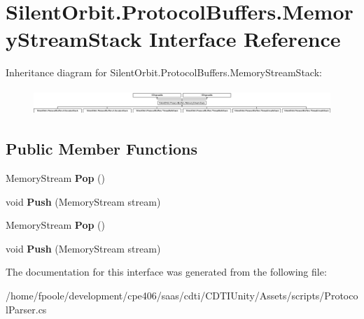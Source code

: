 \hypertarget{interface_silent_orbit_1_1_protocol_buffers_1_1_memory_stream_stack}{}\section{Silent\+Orbit.\+Protocol\+Buffers.\+Memory\+Stream\+Stack Interface Reference}
\label{interface_silent_orbit_1_1_protocol_buffers_1_1_memory_stream_stack}
Inheritance diagram for Silent\+Orbit.\+Protocol\+Buffers.\+Memory\+Stream\+Stack\+:\begin{figure}[H]
\begin{center}
\leavevmode
\includegraphics[height=0.962199cm]{interface_silent_orbit_1_1_protocol_buffers_1_1_memory_stream_stack}
\end{center}
\end{figure}
\subsection*{Public Member Functions}
\begin{DoxyCompactItemize}
\item 
\hypertarget{interface_silent_orbit_1_1_protocol_buffers_1_1_memory_stream_stack_a7408e30789e2d7ee77cd166e69b98a48}{}Memory\+Stream {\bfseries Pop} ()\label{interface_silent_orbit_1_1_protocol_buffers_1_1_memory_stream_stack_a7408e30789e2d7ee77cd166e69b98a48}

\item 
\hypertarget{interface_silent_orbit_1_1_protocol_buffers_1_1_memory_stream_stack_a1ae64da82a0acdfaaec81a0697d3c070}{}void {\bfseries Push} (Memory\+Stream stream)\label{interface_silent_orbit_1_1_protocol_buffers_1_1_memory_stream_stack_a1ae64da82a0acdfaaec81a0697d3c070}

\item 
\hypertarget{interface_silent_orbit_1_1_protocol_buffers_1_1_memory_stream_stack_a7408e30789e2d7ee77cd166e69b98a48}{}Memory\+Stream {\bfseries Pop} ()\label{interface_silent_orbit_1_1_protocol_buffers_1_1_memory_stream_stack_a7408e30789e2d7ee77cd166e69b98a48}

\item 
\hypertarget{interface_silent_orbit_1_1_protocol_buffers_1_1_memory_stream_stack_a1ae64da82a0acdfaaec81a0697d3c070}{}void {\bfseries Push} (Memory\+Stream stream)\label{interface_silent_orbit_1_1_protocol_buffers_1_1_memory_stream_stack_a1ae64da82a0acdfaaec81a0697d3c070}

\end{DoxyCompactItemize}


The documentation for this interface was generated from the following file\+:\begin{DoxyCompactItemize}
\item 
/home/fpoole/development/cpe406/saas/cdti/\+C\+D\+T\+I\+Unity/\+Assets/scripts/Protocol\+Parser.\+cs\end{DoxyCompactItemize}
